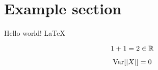 \documentclass{article}
\begin{document}
\section{Example section}

Hello world! \LaTeX

\begin{equation}
1+1 = 2 \in \mathbb R
\end{equation}

\begin{equation*}
\operatorname{Var}[\abs{X}] = 0
\end{equation*}
\end{document}

